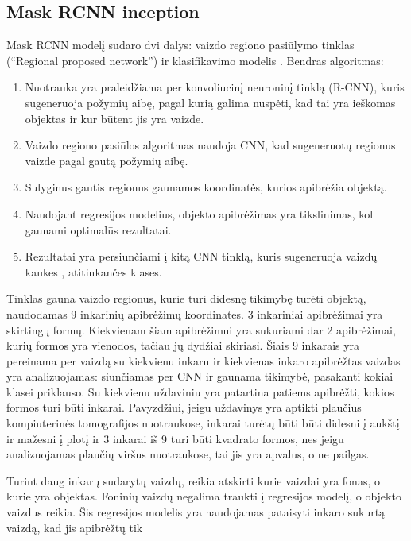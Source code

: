 \documentclass{VUMIFInfKursinis}
\begin{document}
\subsection{Mask RCNN inception}
\par
Mask RCNN modelį sudaro dvi dalys: vaizdo regiono pasiūlymo tinklas (\enquote{Regional proposed network}) ir
klasifikavimo modelis \cite{salt14}. Bendras algoritmas:
\begin{enumerate}
\item Nuotrauka yra praleidžiama per konvoliucinį neuroninį tinklą (R-CNN), kuris
sugeneruoja požymių aibę, pagal kurią galima nuspėti, kad tai yra ieškomas objektas
ir kur būtent jis yra vaizde.
\item Vaizdo regiono pasiūlos algoritmas naudoja CNN, kad sugeneruotų regionus vaizde pagal
gautą požymių aibę.
\item Sulyginus gautis regionus gaunamos koordinatės, kurios apibrėžia objektą.
\item Naudojant regresijos modelius, objekto apibrėžimas yra tikslinimas, kol gaunami
optimalūs rezultatai.
\item Rezultatai yra persiunčiami į kitą CNN tinklą, kuris sugeneruoja vaizdų kaukes
, atitinkančes klases.
\end{enumerate}
\par
Tinklas gauna vaizdo regionus, kurie turi didesnę tikimybę turėti objektą, naudodamas
9 inkarinių apibrėžimų koordinates.
3 inkariniai apibrėžimai yra skirtingų formų. Kiekvienam šiam apibrėžimui yra sukuriami
dar 2 apibrėžimai, kurių formos yra vienodos, tačiau jų dydžiai skiriasi. Šiais 9
inkarais yra pereinama per vaizdą su kiekvienu inkaru ir kiekvienas inkaro apibrėžtas
vaizdas yra analizuojamas: siunčiamas per CNN ir gaunama tikimybė, pasakanti kokiai klasei priklauso. Su kiekvienu uždaviniu yra patartina patiems apibrėžti, kokios formos turi būti inkarai. \cite{salt15}
Pavyzdžiui, jeigu uždavinys yra aptikti plaučius kompiuterinės tomografijos nuotraukose,
inkarai turėtų būti būti didesni į aukštį ir mažesni į plotį ir 3 inkarai iš 9 turi būti
kvadrato formos, nes jeigu analizuojamas plaučių viršus nuotraukose, tai jis yra apvalus,
o ne pailgas.
\par
Turint daug inkarų sudarytų vaizdų, reikia atskirti kurie vaizdai yra fonas, o kurie
yra objektas. Foninių vaizdų negalima traukti į regresijos modelį, o objekto vaizdus reikia.
Šis regresijos modelis yra naudojamas pataisyti inkaro sukurtą vaizdą, kad jis apibrėžtų tik
\end{document}
